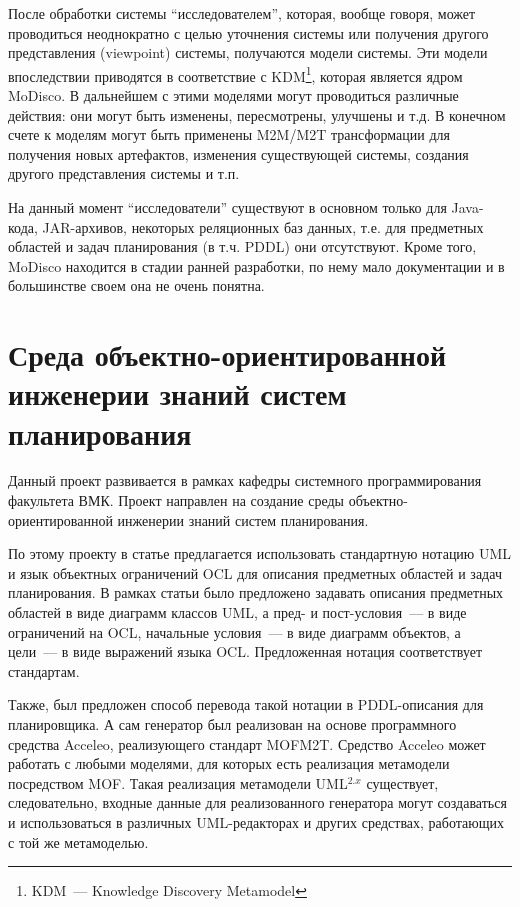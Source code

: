 После обработки системы ``исследователем'', которая, вообще говоря, может проводиться неоднократно с целью уточнения системы или получения другого представления (viewpoint) системы, получаются модели системы.
Эти модели впоследствии приводятся в соответствие с KDM\footnote{KDM~--- Knowledge Discovery Metamodel}, которая является ядром MoDisco.
В дальнейшем с этими моделями могут проводиться различные действия: они могут быть изменены, пересмотрены, улучшены и т.д.
В конечном счете к моделям могут быть применены M2M/M2T трансформации для получения новых артефактов, изменения существующей системы, создания другого представления системы и т.п.


На данный момент ``исследователи'' существуют в основном только для Java-кода, JAR-архивов, некоторых реляционных баз данных, т.е. для предметных областей и задач планирования (в  т.ч. PDDL) они отсутствуют. 
Кроме того, MoDisco находится в стадии ранней разработки, по нему мало документации и в большинстве своем она не очень понятна.
  

\section{Среда объектно-ориентированной инженерии знаний систем планирования}\label{sec:seminar}   

Данный проект развивается в рамках кафедры системного программирования факультета ВМК. Проект направлен на создание среды объектно-ориентированной инженерии знаний систем планирования. 

По этому проекту в статье \cite{mal-manz} предлагается использовать стандартную нотацию UML и язык объектных ограничений OCL для описания предметных областей и задач планирования. В рамках статьи было предложено задавать описания предметных областей в виде диаграмм классов UML, а пред- и пост-условия~--- в виде ограничений на OCL, начальные условия~--- в виде диаграмм объектов, а цели~--- в виде выражений языка OCL. Предложенная нотация соответствует стандартам.
 
Также, был предложен способ перевода такой нотации в PDDL-описания для планировщика.
А сам генератор был реализован на основе программного средства Acceleo, реализующего стандарт MOFM2T\cite{mofm2t}. Средство Acceleo может работать с любыми моделями, для которых есть реализация метамодели посредством MOF. Такая реализация метамодели UML$^{2.x}$ существует, следовательно, входные данные для реализованного генератора могут создаваться и использоваться в различных UML-редакторах и других средствах, работающих с той же метамоделью.

